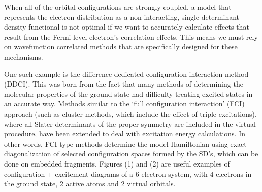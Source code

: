 \documentclass[10pt]{article}
\begin{document}
When all of the orbital configurations are strongly coupled, a model that represents the electron distribution as a non-interacting, single-determinant density functional is not optimal if we want to accurately calculate effects that result from the Fermi level electron's correlation effects. This means we must rely on wavefunction correlated methods that are specifically designed for these mechanisms. 

One such example is the difference-dedicated configuration interaction method (DDCI). This was born from the fact that many methods of determining the molecular properties of the ground state had difficulty treating excited states in an accurate way. Methods similar to the `full configuration interaction' (FCI) approach (such as cluster methods, which include the effect of triple excitations), where all Slater determinants of the proper symmetry are included in the virtual procedure, have been extended to deal with excitation energy calculations. In other words, FCI-type methods determine the model Hamiltonian using exact diagonalization of selected configuration spaces formed by the SD's, which can be done on embedded fragments. Figures (1) and (2) are useful examples of configuration + excitement diagrams of a 6 electron system, with 4 electrons in the ground state, 2 active atoms and 2 virtual orbitals.
\end{document}
